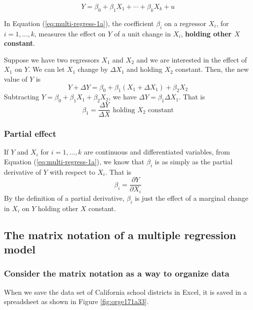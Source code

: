 \documentclass[a4paper,11pt]{article}
\begin{document}
\begin{equation}
\label{eq:multi-regress-1a}
Y = \beta_0 + \beta_1 X_1 + \cdots + \beta_k X_k + u
\end{equation}

In Equation (\ref{eq:multi-regress-1a}), the coefficient \(\beta_i\) on
a regressor \(X_i\), for \(i=1, \ldots, k\), measures the effect on \(Y\) of a
unit change in \(X_i\), \textbf{holding other \(X\) constant}.

Suppose we have two regressors \(X_1\) and \(X_2\) and we are interested
in the effect of \(X_1\) on \(Y\). We can let \(X_1\) change by \(\Delta X_1\)
and holding \(X_2\) constant. Then, the new value of \(Y\) is
\[
Y + \Delta Y = \beta_0 + \beta_1 (X_1 + \Delta X_1) + \beta_2 X_2
\]
Subtracting \(Y = \beta_0 + \beta_1 X_1 + \beta_2 X_2\), we have
\(\Delta Y = \beta_1 \Delta X_1\). That is
\[ \beta_1 = \frac{\Delta Y}{\Delta X} \text{ holding } X_2 \text{ constant} \]

\subsubsection*{Partial effect}
\label{sec:org53abacb}

If \(Y\) and \(X_i\) for \(i = 1, \ldots, k\) are continuous and
differentiated variables, from Equation (\ref{eq:multi-regress-1a}),
we know that \(\beta_i\) is as simply as the partial derivative of \(Y\) with
respect to \(X_i\). That is \[\beta_i = \frac{\partial Y}{\partial
X_i}\] By the definition of a partial derivative, \(\beta_i\) is just
the effect of a marginal change in \(X_i\) on \(Y\) holding other \(X\)
constant.


\subsection{The matrix notation of a multiple regression model}
\label{sec:org01c24c9}

\subsubsection*{Consider the matrix notation as a way to organize data}
\label{sec:orga026506}

When we save the data set of California school districts in Excel, it
is saved in a spreadsheet as shown in Figure \ref{fig:orge171a33}.
\end{document}
